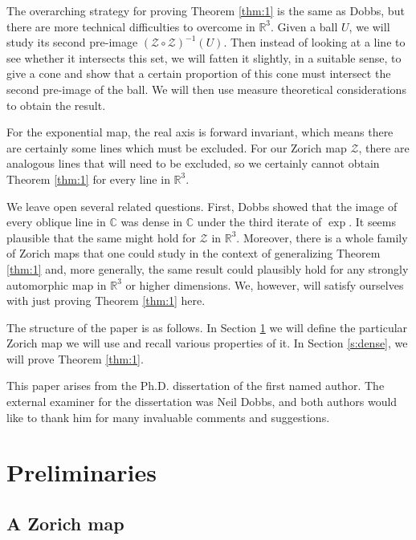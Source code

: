 \documentclass[11pt]{amsart}
\numberwithin{equation}{section}
\theoremstyle{definition}
\theoremstyle{definition}
\theoremstyle{definition}
\newcommand{\R}{\mathbb{R}}
\newcommand{\C}{\mathbb{C}}
\begin{document}
The overarching strategy for proving Theorem \ref{thm:1} is the same as Dobbs, but there are more technical difficulties to overcome in $\R^3$. Given a ball $U$, we will study its second pre-image $(\mathcal{Z}\circ\mathcal{Z})^{-1}(U)$. Then instead of looking at a line to see whether it intersects this set, we will fatten it slightly, in a suitable sense, to give a cone and show that a certain proportion of this cone must intersect the second pre-image of the ball. We will then use measure theoretical considerations to obtain the result.

For the exponential map, the real axis is forward invariant, which means there are certainly some lines which must be excluded. For our Zorich map $\mathcal{Z}$, there are analogous lines that will need to be excluded, so we certainly cannot obtain Theorem \ref{thm:1} for every line in $\R^3$.

We leave open several related questions. First, Dobbs \cite[Theorem 3]{Dob15} showed that the image of every oblique line in $\C$ was dense in $\C$ under the third iterate of $\exp$. It seems plausible that the same might hold for $\mathcal{Z}$ in $\R^3$. Moreover, there is a whole family of Zorich maps that one could study in the context of generalizing Theorem \ref{thm:1} and, more generally, the same result could plausibly hold for any strongly automorphic map in $\R^3$ or higher dimensions. We, however, will satisfy ourselves with just proving Theorem \ref{thm:1} here.

The structure of the paper is as follows. In Section \ref{s:prelims} we will define the particular Zorich map we will use and recall various properties of it. In Section \ref{s:dense}, we will prove Theorem \ref{thm:1}.

This paper arises from the Ph.D. dissertation of the first named author. The external examiner for the dissertation was Neil Dobbs, and both authors would like to thank him for many invaluable comments and suggestions.


\section{Preliminaries}
\label{s:prelims}

\subsection{A Zorich map}
\label{ss:zorich}
\end{document}
